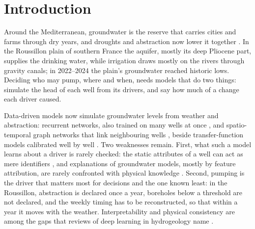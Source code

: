 \section{Introduction}\label{sec:intro}

Around the Mediterranean, groundwater is the reserve that carries cities and farms through dry
years, and droughts and abstraction now lower it together \citep{Costa2025Five}. In the Roussillon
plain of southern France the aquifer, mostly its deep Pliocene part, supplies the drinking water,
while irrigation draws mostly on the rivers through gravity canals; in 2022--2024 the plain's
groundwater reached historic lows. Deciding who may pump, where and when, needs models that do two things:
simulate the head of each well from its drivers, and say how much of a change each driver caused.

Data-driven models now simulate groundwater levels from weather and abstraction: recurrent networks,
also trained on many wells at once \citep{Wunsch2021Groundwater,Chidepudi2025Training}, and
spatio-temporal graph networks that link neighbouring wells
\citep{Bai2023Graph,Taccari2024Spatial,Wu2025Forecasting}, beside transfer-function models
calibrated well by well \citep{Collenteur2019Pastas}. Two weaknesses remain. First,
what such a model learns about a driver is rarely checked: the static attributes of a well can act as
mere identifiers \citep{Heudorfer2024On}, and explanations of groundwater models, mostly by feature
attribution, are rarely confronted with physical knowledge \citep{Clark2025Explainable,
Zounematkermani2026Explainable}. Second, pumping is the driver that matters most for decisions and
the one known least: in the Roussillon, abstraction is declared once a year, boreholes below a
threshold are not declared, and the weekly timing has to be reconstructed, so that within a year it
moves with the weather. Interpretability and physical consistency are among the gaps that reviews
of deep learning in hydrogeology name \citep{Dai2025Incorporating}.

